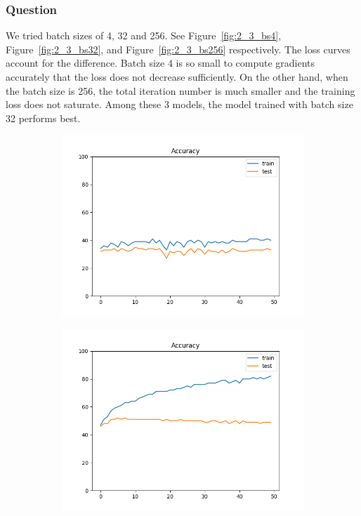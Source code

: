 \documentclass[12pt]{article}
\begin{document}
\subsubsection{Question}
We tried batch sizes of 4, 32 and 256. See Figure~\ref{fig:2_3_bs4}, Figure~\ref{fig:2_3_bs32}, and Figure~\ref{fig:2_3_bs256} respectively. The loss curves account for the difference. Batch size 4 is so small to compute gradients accurately that the loss does not decrease sufficiently. On the other hand, when the batch size is 256, the total iteration number is much smaller and the training loss does not saturate. Among these 3 models, the model trained with batch size 32 performs best.
\begin{figure}
  \begin{subfigure}{0.16\textwidth}
    \centering
    \includegraphics[width=\linewidth]{accuracies_2_1.png}
  \end{subfigure}
  \begin{subfigure}{0.16\textwidth}
    \centering
    \includegraphics[width=\linewidth]{accuracies_2_2.png}

\end{subfigure}
\end{figure}
\end{document}
